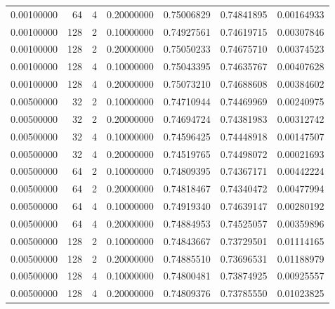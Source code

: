 \begin{table}[htbp]
{\begin{tabular}{rrrrrrr}
0.00100000 & 64 & 4 & 0.20000000 & 0.75006829 & 0.74841895 & 0.00164933 \\
0.00100000 & 128 & 2 & 0.10000000 & 0.74927561 & 0.74619715 & 0.00307846 \\
0.00100000 & 128 & 2 & 0.20000000 & 0.75050233 & 0.74675710 & 0.00374523 \\
0.00100000 & 128 & 4 & 0.10000000 & 0.75043395 & 0.74635767 & 0.00407628 \\
0.00100000 & 128 & 4 & 0.20000000 & 0.75073210 & 0.74688608 & 0.00384602 \\
0.00500000 & 32 & 2 & 0.10000000 & 0.74710944 & 0.74469969 & 0.00240975 \\
0.00500000 & 32 & 2 & 0.20000000 & 0.74694724 & 0.74381983 & 0.00312742 \\
0.00500000 & 32 & 4 & 0.10000000 & 0.74596425 & 0.74448918 & 0.00147507 \\
0.00500000 & 32 & 4 & 0.20000000 & 0.74519765 & 0.74498072 & 0.00021693 \\
0.00500000 & 64 & 2 & 0.10000000 & 0.74809395 & 0.74367171 & 0.00442224 \\
0.00500000 & 64 & 2 & 0.20000000 & 0.74818467 & 0.74340472 & 0.00477994 \\
0.00500000 & 64 & 4 & 0.10000000 & 0.74919340 & 0.74639147 & 0.00280192 \\
0.00500000 & 64 & 4 & 0.20000000 & 0.74884953 & 0.74525057 & 0.00359896 \\
0.00500000 & 128 & 2 & 0.10000000 & 0.74843667 & 0.73729501 & 0.01114165 \\
0.00500000 & 128 & 2 & 0.20000000 & 0.74885510 & 0.73696531 & 0.01188979 \\
0.00500000 & 128 & 4 & 0.10000000 & 0.74800481 & 0.73874925 & 0.00925557 \\
0.00500000 & 128 & 4 & 0.20000000 & 0.74809376 & 0.73785550 & 0.01023825 \\
\hline
\end{tabular}
}
\end{table}
